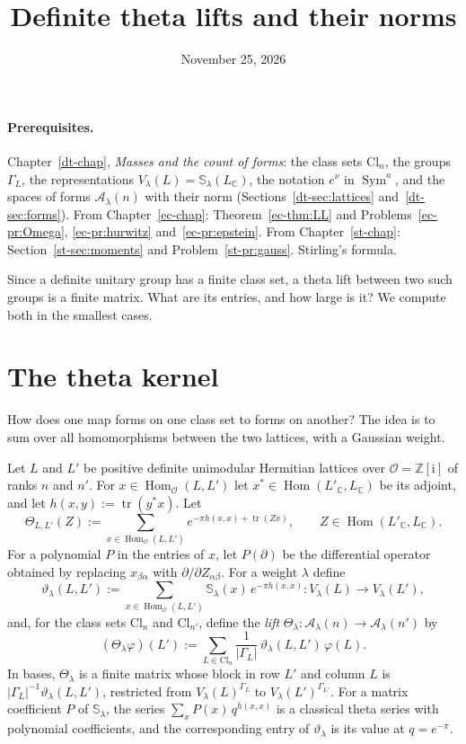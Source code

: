 \documentclass[reqno]{amsart}
\title{Definite theta lifts and their norms}
\author{}
\date{November 25, 2026}
\newcounter{chap}
\theoremstyle{definition}
\theoremstyle{plain}
\newcommand{\Z}{\mathbb{Z}}
\newcommand{\C}{\mathbb{C}}
\newcommand{\ii}{\mathrm{i}}
\newcommand{\Oc}{\mathcal{O}}
\newcommand{\Sc}{\mathbb{S}}
\newcommand{\Ac}{\mathcal{A}}
\newcommand{\Cl}{\mathrm{Cl}}
\newcommand{\Hom}{\operatorname{Hom}}
\newcommand{\Sym}{\operatorname{Sym}}
\newcommand{\tr}{\operatorname{tr}}
\begin{document}
\maketitle
{}\label{chap}

\paragraph{Prerequisites.}
Chapter~\ref{dt-chap}, \emph{Masses and the count of forms}: the class sets \(\Cl_n\), the groups \(\Gamma_L\), the representations \(V_\lambda(L) = \Sc_\lambda(L_\C)\), the notation \(e^\nu\) in \(\Sym^a\), and the spaces of forms \(\Ac_\lambda(n)\) with their norm (Sections~\ref{dt-sec:lattices} and~\ref{dt-sec:forms}).  From Chapter~\ref{ec-chap}: Theorem~\ref{ec-thm:LL} and Problems~\ref{ec-pr:Omega}, \ref{ec-pr:hurwitz} and~\ref{ec-pr:epstein}.  From Chapter~\ref{st-chap}: Section~\ref{st-sec:moments} and Problem~\ref{st-pr:gauss}.  Stirling's formula.

Since a definite unitary group has a finite class set, a theta lift between two such groups is a finite matrix.  What are its entries, and how large is it?  We compute both in the smallest cases.


\section{The theta kernel}\label{sec:kernel}

How does one map forms on one class set to forms on another?  The idea is to sum over all homomorphisms between the two lattices, with a Gaussian weight.

Let \(L\) and \(L'\) be positive definite unimodular Hermitian lattices over \(\Oc = \Z[\ii]\) of ranks \(n\) and \(n'\).  For \(x \in \Hom_\Oc(L, L')\) let \(x^* \in \Hom(L'_\C, L_\C)\) be its adjoint, and let \(h(x,y) := \tr(y^* x)\).  Let
\[
  \Theta_{L,L'}(Z) := \sum_{x \in \Hom_\Oc(L,L')} e^{-\pi h(x,x) + \tr(Z x)},
  \qquad Z \in \Hom(L'_\C, L_\C) .
\]
For a polynomial \(P\) in the entries of \(x\), let \(P(\partial)\) be the differential operator obtained by replacing \(x_{\beta\alpha}\) with \(\partial/\partial Z_{\alpha\beta}\).  For a weight \(\lambda\) define
\[
  \vartheta_\lambda(L, L') := \sum_{x \in \Hom_\Oc(L,L')} \Sc_\lambda(x)\, e^{-\pi h(x,x)} \colon V_\lambda(L) \to V_\lambda(L'),
\]
and, for the class sets \(\Cl_n\) and \(\Cl_{n'}\), define the \emph{lift} \(\Theta_\lambda \colon \Ac_\lambda(n) \to \Ac_\lambda(n')\) by
\begin{equation}\label{eq:lift}
  (\Theta_\lambda \varphi)(L') := \sum_{L \in \Cl_n} \frac{1}{\lvert\Gamma_L\rvert}\, \vartheta_\lambda(L, L')\, \varphi(L) .
\end{equation}
In bases, \(\Theta_\lambda\) is a finite matrix whose block in row \(L'\) and column \(L\) is \(\lvert\Gamma_L\rvert^{-1}\vartheta_\lambda(L,L')\), restricted from \(V_\lambda(L)^{\Gamma_L}\) to \(V_\lambda(L')^{\Gamma_{L'}}\).  For a matrix coefficient \(P\) of \(\Sc_\lambda\), the series \(\sum_x P(x)\, q^{h(x,x)}\) is a classical theta series with polynomial coefficients, and the corresponding entry of \(\vartheta_\lambda\) is its value at \(q = e^{-\pi}\).
\end{document}
